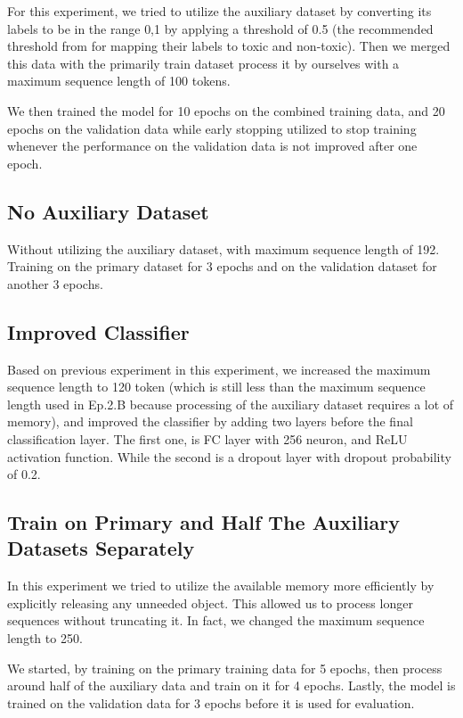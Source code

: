 \documentclass[10pt,twocolumn,letterpaper]{article}
\begin{document}
For this experiment, we tried to utilize the auxiliary dataset by converting its labels to be in the range {0,1} by applying a threshold of 0.5 (the recommended threshold from \cite{Jigsaw2} for mapping their labels to toxic and non-toxic). Then we merged this data with the primarily train dataset process it by ourselves with a maximum sequence length of 100 tokens. 

We then trained the model for 10 epochs on the combined training data, and 20 epochs on the validation data while early stopping utilized to stop training whenever the performance on the validation data is not improved after one epoch. 

\subsection{No Auxiliary Dataset}

Without utilizing the auxiliary dataset, with maximum sequence length of 192. Training on the primary dataset for 3
epochs and on the validation dataset for another 3 epochs.

\subsection{Improved Classifier}

Based on previous experiment in this experiment, we increased the maximum sequence length to 120 token (which is still less than the maximum sequence length used in Ep.2.B because processing of the auxiliary dataset requires a lot of memory), and improved the classifier by adding two layers before the final classification layer. The first one, is FC layer with 256 neuron, and ReLU activation function. While the second is a dropout layer with dropout probability of 0.2.

\subsection{Train on Primary and Half The Auxiliary Datasets Separately}

In this experiment we tried to utilize the available memory more efficiently by explicitly releasing any unneeded object. This allowed us to process longer sequences without truncating it. In fact, we changed the maximum sequence length to 250. 

We started, by training on the primary training data for 5 epochs, then process around half of the auxiliary data and train on it for 4 epochs. Lastly, the model is trained on the validation data for 3 epochs before it is used for evaluation. 
\end{document}
